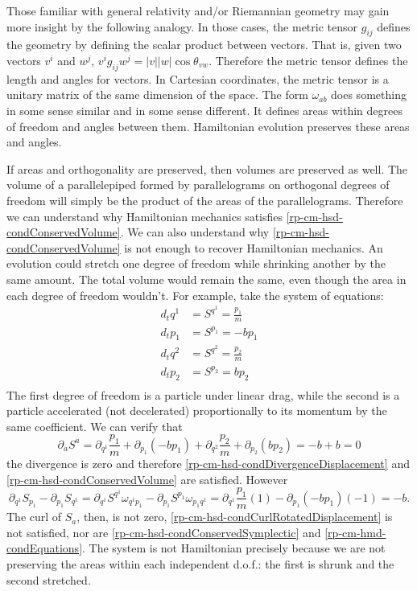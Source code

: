 Those familiar with general relativity and/or Riemannian geometry may gain more insight by the following analogy. In those cases, the metric tensor $g_{ij}$ defines the geometry by defining the scalar product between vectors. That is, given two vectors $v^i$ and $w^j$, $v^i g_{ij} w^j = |v| |w| \cos \theta_{vw}$. Therefore the metric tensor defines the length and angles for vectors. In Cartesian coordinates, the metric tensor is a unitary matrix of the same dimension of the space. The form $\omega_{ab}$ does something in some sense similar and in some sense different. It defines areas within degrees of freedom and angles between them. Hamiltonian evolution preserves these areas and angles.

If areas and orthogonality are preserved, then volumes are preserved as well. The volume of a parallelepiped formed by parallelograms on orthogonal degrees of freedom will simply be the product of the areas of the parallelograms. Therefore we can understand why Hamiltonian mechanics satisfies \ref{rp-cm-hsd-condConservedVolume}. We can also understand why \ref{rp-cm-hsd-condConservedVolume} is not enough to recover Hamiltonian mechanics. An evolution could stretch one degree of freedom while shrinking another by the same amount. The total volume would remain the same, even though the area in each degree of freedom wouldn't. For example, take the system of equations:
\begin{equation}
	\begin{aligned}
	d_t q^1 &= S^{q^1} = \frac{p_1}{m} \\
	d_t p_1 &= S^{p_1} = - b p_1 \\
	d_t q^2 &= S^{q^2} = \frac{p_2}{m} \\
	d_t p_2 &= S^{p_2} = b p_2 \\
	\end{aligned}
\end{equation}
The first degree of freedom is a particle under linear drag, while the second is a particle accelerated (not decelerated) proportionally to its momentum by the same coefficient. We can verify that
\begin{equation}
	\partial_a S^a = \partial_{q^1} \frac{p_1}{m} + \partial_{p_1} (-b p_1) + \partial_{q^2} \frac{p_2}{m} + \partial_{p_2} (b p_2) = - b +b = 0
\end{equation}
the divergence is zero and therefore \ref{rp-cm-hsd-condDivergenceDisplacement} and \ref{rp-cm-hsd-condConservedVolume} are satisfied. However
\begin{equation}
	\partial_{q^1} S_{p_1} - \partial_{p_1} S_{q^1} = \partial_{q^1} S^{q^1} \omega_{q^1 p_1} - \partial_{p_1} S^{p_1} \omega_{p_1 q^1} = \partial_{q^1} \frac{p_1}{m} (1) - \partial_{p_1} (-b p_1) (-1) = -b.
\end{equation}
The curl of $S_a$, then, is not zero, \ref{rp-cm-hsd-condCurlRotatedDisplacement} is not satisfied, nor are \ref{rp-cm-hsd-condConservedSymplectic} and \ref{rp-cm-hmd-condEquations}. The system is not Hamiltonian precisely because we are not preserving the areas within each independent d.o.f.: the first is shrunk and the second stretched.

